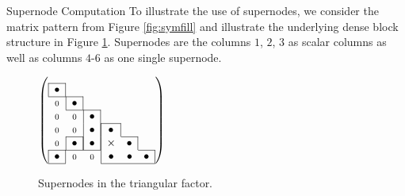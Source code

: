 \begin{example}{Supernode Computation}\label{exm:supernode_computation}
To illustrate the use of supernodes, we consider the matrix pattern
from Figure \ref{fig:symfill} and illustrate the underlying
dense block structure in Figure \ref{fig:supernode}.
Supernodes are the columns $1$, $2$, $3$ as scalar columns as well as columns
$4$-$6$ as one single supernode.
\end{example}
\begin{figure}
\begin{minipage}{.45\textwidth}
    $\left(
        \begin{array}{cccccc}
         \\[-1.5ex]\cline{1-1}
         \multicolumn{1}{|c|}{\bullet}&       &       &       &       &         \\ \cline{1-2}
         \nl    &\multicolumn{1}{|c|}{\bullet}&       &       &       &         \\ \cline{2-3}
         \nl    &\nl    &\multicolumn{1}{|c|}{\bullet}&       &       &         \\ \cline{4-4}
         \nl    &\nl    & \multicolumn{1}{|c|}{\bullet}   &\multicolumn{1}{|c|}{\bullet}&       &         \\ \cline{2-2}\cline{5-5}
         \nl    &\multicolumn{1}{|c|}{\bullet}& \multicolumn{1}{|c|}{\bullet}   &\multicolumn{1}{|c}{\times}&\multicolumn{1}{c|}{\bullet}&         \\ \cline{1-3}\cline{6-6}
         \multicolumn{1}{|c|}{\bullet}&\nl& \nl   &\multicolumn{1}{|c}{\bullet}&\bullet& \multicolumn{1}{c|}{\bullet}\\
\cline{1-1}\cline{4-6}
 \end{array}
    \right)$
\end{minipage}
    \caption{Supernodes in the triangular factor.}
    \label{fig:supernode}
\end{figure}

